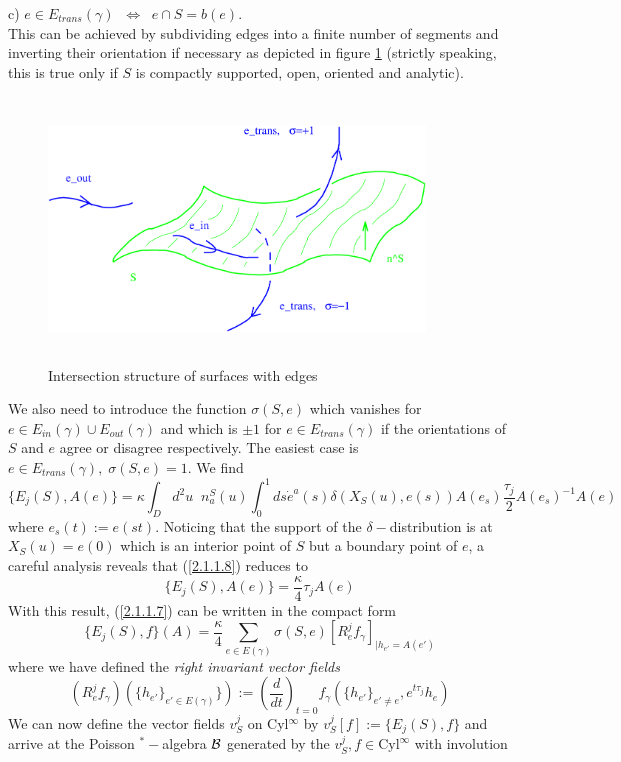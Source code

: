 \documentclass[12pt]{report}
\def\be{\begin{equation}}
\def\ee{\end{equation}}
\begin{document}
c) $e\in E_{trans}(\gamma)\;\;\Leftrightarrow\;\;e\cap S=b(e)$.\\
This can be achieved by subdividing edges into a finite number of segments 
and inverting 
their orientation if necessary as depicted in figure \ref{f7}
(strictly speaking, this is true only if $S$ is compactly supported,
open, oriented and analytic).  
%
\begin{figure}
\includegraphics[width=10cm,height=7cm]{proc9fig7.ps}
\caption{Intersection structure of surfaces with edges}
\label{f7}
\end{figure}
%
We also need to introduce the 
function $\sigma(S,e)$ which vanishes for 
$e\in E_{in}(\gamma)\cup E_{out}(\gamma)$ and which is $\pm 1$ 
for $e\in E_{trans}(\gamma)$ if the 
orientations of $S$ and $e$ agree or disagree respectively.
The easiest case is $e\in E_{trans}(\gamma),\;\sigma(S,e)=1$. 
We find 
\be \label{2.1.1.8}
\{E_j(S),A(e)\}=\kappa\int_D d^2u\;\; n_a^S(u)\int_0^1 ds \dot{e}^a(s)
\delta(X_S(u),e(s)) A(e_s)\frac{\tau_j}{2} A(e_s)^{-1} A(e)
\ee
where $e_s(t):=e(st)$. Noticing that the support of the $\delta-$distribution
is at $X_S(u)=e(0)$ which is an interior point of $S$ but a boundary 
point of $e$, a careful analysis reveals that (\ref{2.1.1.8}) reduces to
\be \label{2.1.1.9}
\{E_j(S),A(e)\}=\frac{\kappa}{4}\tau_j A(e)
\ee
With this result, (\ref{2.1.1.7}) can be written in the compact form
\be \label{2.1.1.10}
\{E_j(S),f\}(A)=\frac{\kappa}{4}\sum_{e\in E(\gamma)}
\sigma(S,e) [R_e^j f_\gamma]_{|h_{e'}=A(e')}
\ee
where we have defined the {\it right invariant vector fields}
\be \label{2.1.1.11}
(R_e^j f_\gamma)(\{h_{e'}\}_{e'\in E(\gamma)}\}):=
(\frac{d}{dt})_{t=0} f_\gamma(\{h_{e'}\}_{e'\not=e},e^{t\tau_j} h_e)
\ee
We can now define the vector fields $v_S^j$ on Cyl$^\infty$ by 
$v_S^j[f]:=\{E_j(S),f\}$ and arrive at the Poisson $^\ast-$algebra
${\cal B}$ generated by the $v^j_S,f\in \mbox{Cyl}^\infty$ with involution 
\end{document}
